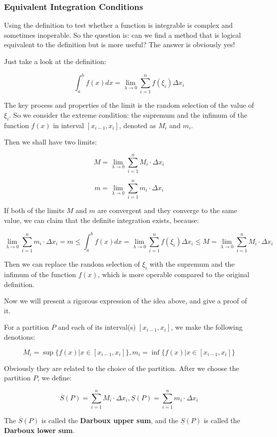 \documentclass[oneside]{book}
\begin{document}
\subsubsection{Equivalent Integration Conditions}

Using the definition to test whether a function is integrable is complex and sometimes inoperable. So the question is: can we find a method that is logical equivalent to the definition but is more useful? The answer is obviously yes!

Just take a look at the definition: 

\[\int_{a}^{b} f(x) dx =\lim_{\lambda \to 0} \sum_{i=1}^{n} f(\xi_i)\Delta x_i\]

The key process and properties of the limit is the random selection of the value of $\xi_i$. So we consider the extreme condition: the supremum and the infimum of the function $f(x)$ in interval $[x_{i-1},x_i]$, denoted as $M_i$ and $m_i$.

Then we shall have two limits:

\[M = \lim_{\lambda \to 0} \sum_{i=1}^{n}M_i \cdot \Delta x_i\]

\[m = \lim_{\lambda \to 0} \sum_{i=1}^{n}m_i \cdot \Delta x_i\]

If both of the limits $M$ and $m$ are convergent and they converge to the same value, we can claim that the definite integration exists, because:

\[\lim_{\lambda \to 0} \sum_{i=1}^{n}m_i \cdot \Delta x_i = m \leq \int_{a}^{b} f(x) dx =\lim_{\lambda \to 0} \sum_{i=1}^{n} f(\xi_i)\Delta x_i \leq M = \lim_{\lambda \to 0} \sum_{i=1}^{n}M_i \cdot \Delta x_i\]

Then we can replace the random selection of $\xi_i$ with the supremum and the infimum of the function $f(x)$, which is more operable compared to the original definition.

Now we will present a rigorous expression of the idea above, and give a proof of it.

\begin{definition}
For a partition $P$ and each of its interval(s) $[x_{i-1},x_i]$, we make the following denotions:

\[
M_i = \sup\{f(x)|x \in [x_{i-1},x_i]\}, m_i = \inf\{f(x)|x \in [x_{i-1},x_i]\}
\]

Obviously they are related to the choice of the partition. After we choose the partition $P$, we define:

\[
\overline{S}(P) = \sum_{i=1}^{n} M_i \cdot \Delta x_i , \underline{S}(P) = \sum_{i=1}^{n} m_i \cdot \Delta x_i
\]

The $\overline{S}(P)$ is called the \textbf{Darboux upper sum}, and the $\underline{S}(P)$ is called the \textbf{Darboux lower sum}.
\end{definition}
\end{document}
